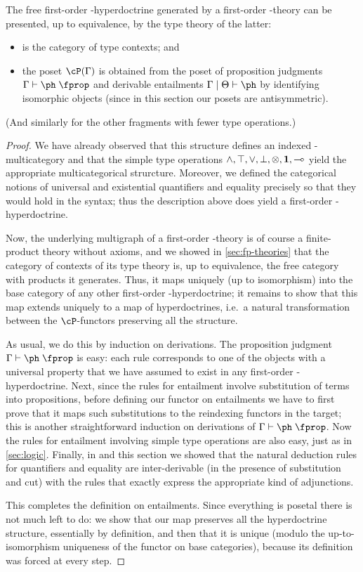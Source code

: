 \begin{thm}\label{thm:fol-initial}
  The free first-order \fS-hyperdoctrine generated by a first-order \fS-theory can be presented, up to equivalence, by the type theory of the latter:
  \begin{itemize}
  \item \cS is the category of type contexts; and
  \item the poset $\cP(\Gamma)$ is obtained from the poset of proposition judgments $\Gamma\types \ph\prop$ and derivable entailments $\Gamma\cb\Theta\types\ph$ by identifying isomorphic objects (since in this section our posets are antisymmetric).
  \end{itemize}
  (And similarly for the other fragments with fewer type operations.)
\end{thm}
\begin{proof}
  We have already observed that this structure defines an indexed \fS-multicategory and that the simple type operations $\wedge,\top,\vee,\bot,\otimes,\mathbf{1},\multimap$ yield the appropriate multicategorical strurcture.
  Moreover, we defined the categorical notions of universal and existential quantifiers and equality precisely so that they would hold in the syntax; thus the description above does yield a first-order \fS-hyperdoctrine.

  Now, the underlying multigraph of a first-order \fS-theory is of course a finite-product theory without axioms, and we showed in \cref{sec:fp-theories} that the category of contexts of its type theory is, up to equivalence, the free category with products it generates.
  Thus, it maps uniquely (up to isomorphism) into the base category of any other first-order \fS-hyperdoctrine; it remains to show that this map extends uniquely to a map of hyperdoctrines, i.e.\ a natural transformation between the $\cP$-functors preserving all the structure.

  As usual, we do this by induction on derivations.
  The proposition judgment $\Gamma\types \ph\prop$ is easy: each rule corresponds to one of the objects with a universal property that we have assumed to exist in any first-order \fS-hyperdoctrine.
  Next, since the rules for entailment involve substitution of terms into propositions, before defining our functor on entailments we have to first prove that it maps such substitutions to the reindexing functors in the target; this is another straightforward induction on derivations of $\Gamma\types \ph\prop$.
  Now the rules for entailment involving simple type operations are also easy, just as in \cref{sec:logic}.
  Finally, in  and this section we showed that the natural deduction rules for quantifiers and equality are inter-derivable (in the presence of substitution and cut) with the rules that exactly express the appropriate kind of adjunctions.

  This completes the definition on entailments.
  Since everything is posetal there is not much left to do: we show that our map preserves all the hyperdoctrine structure, essentially by definition, and then that it is unique (modulo the up-to-isomorphism uniqueness of the functor on base categories), because its definition was forced at every step.
\end{proof}

